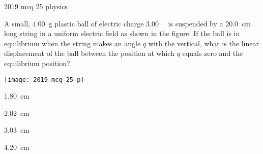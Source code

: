 \ylDisplay
{}%
{2019}%
{mcq}%
{25}%
{physics}%
{}%
{
\ifStatement
A small, \SI{4.00}{\g} plastic ball of electric charge \SI{3.00}{\micro\C} is  suspended by a \SI{20.0}{\cm} long string in a uniform electric field as shown in the figure. If the ball is in equilibrium when the string makes an angle $q$ with the vertical, what is the linear displacement of the ball between the position at which $q$ equals zero and the equilibrium position?
\begin{center}
  \texttt{[image: 2019-mcq-25-p]}
\end{center}

\fi


\SI{1.80}{\cm}
\fi


\SI{2.02}{\cm}
\fi


\SI{3.03}{\cm}
\fi


\SI{4.20}{\cm}
\fi


\ifHint

\fi


\ifSolution

\fi


\ifEstStatement

\fi



\fi



\fi



\fi



\fi


\ifEstHint

\fi


\ifEstSolution

\fi
}
